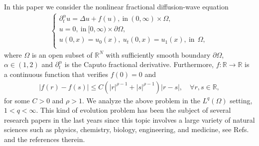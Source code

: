 \documentclass[12pt,reqno]{amsart}
\newcommand{\R}{\mathbb{R}}	%
\begin{document}
	
In this paper we consider the  nonlinear fractional diffusion-wave equation 
\begin{eqnarray}\label{wave}	 					
	\left\{\begin{array}{lrr}
		\partial_t^{\alpha}u  = \Delta u  + f(u), \ \mbox{in}\ (0,\infty)\times\Omega,\\	
		u  =  0, \ \mbox{in} \  [0,\infty)\times \partial\Omega,\\
		u(0,x)=u_0(x),\ u_t(0,x)=u_1(x),\ \mbox{in}\ \ \Omega,\\
	\end{array} \right.	
\end{eqnarray}
	where $\Omega$ is an open subset of  $\R^N$ with sufficiently smooth boundary $\partial\Omega$, $\alpha\in (1,2)$ and $\partial_t^{\alpha}$ is the Caputo fractional derivative. Furthermore,  $f:\mathbb{R}\to\mathbb{R}$ is a continuous function that verifies $f(0)=0$ and 
	\begin{eqnarray}\label{fc}
		|f(r)-f(s)|\leq C(|r|^{\rho-1}+|s|^{\rho-1})|r-s|,\quad \forall r,s\in\mathbb{R},
	\end{eqnarray}
	for some $C>0$ and $\rho>1$.
	We analyze the above problem in the $L^q(\Omega)$ setting, $1<q<\infty$.
This kind of evolution problem has been the subject of several research papers in the last years since this topic involves a large variety of natural sciences such as physics, chemistry, biology, engineering, and medicine, see Refs. \cite{Bouchaud,Fre, MK,MIMP, Uch} and the references therein. 
			
\end{document}
